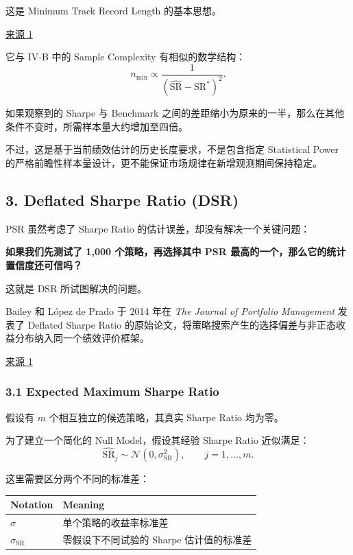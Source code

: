 这是 Minimum Track Record Length 的基本思想。

\href{https://papers.ssrn.com/sol3/papers.cfm?abstract_id=1821643.}{来源 1}

它与 IV-B 中的 Sample Complexity 有相似的数学结构：
\[n_{\min}
\propto
\frac1{(\widehat{\mathrm{SR}}-\mathrm{SR}^*)^2}.\]

如果观察到的 Sharpe 与 Benchmark 之间的差距缩小为原来的一半，那么在其他条件不变时，所需样本量大约增加至四倍。

不过，这是基于当前绩效估计的历史长度要求，不是包含指定 Statistical Power 的严格前瞻性样本量设计，更不能保证市场规律在新增观测期间保持稳定。

\hypertarget{part-4-71-0001-deflated-sharpe-ratio-dsr}{%
\subsection{3. Deflated Sharpe Ratio (DSR)}\label{part-4-71-0001-deflated-sharpe-ratio-dsr}}

PSR 虽然考虑了 Sharpe Ratio 的估计误差，却没有解决一个关键问题：

\textbf{如果我们先测试了 1,000 个策略，再选择其中 PSR 最高的一个，那么它的统计置信度还可信吗？}

这就是 DSR 所试图解决的问题。

Bailey 和 López de Prado 于 2014 年在 \emph{The Journal of Portfolio Management} 发表了 Deflated Sharpe Ratio 的原始论文，将策略搜索产生的选择偏差与非正态收益分布纳入同一个绩效评价框架。

\href{https://doi.org/10.3905/jpm.2014.40.5.094?trk=article-ssr-frontend-pulse_little-text-block}{来源 1}

\hypertarget{part-4-71-0001-expected-maximum-sharpe-ratio}{%
\subsubsection{3.1 Expected Maximum Sharpe Ratio}\label{part-4-71-0001-expected-maximum-sharpe-ratio}}

假设有 \(m\) 个相互独立的候选策略，其真实 Sharpe Ratio 均为零。

为了建立一个简化的 Null Model，假设其经验 Sharpe Ratio 近似满足：
\[\widehat{\mathrm{SR}}_j
\sim\mathcal N(0,\sigma_{\mathrm{SR}}^2),
\qquad j=1,\ldots,m.\]

这里需要区分两个不同的标准差：

\begin{readertable}
\begin{longtable}[]{@{}
  >{\raggedright\arraybackslash}p{}
  >{\raggedright\arraybackslash}p{}@{}}
\toprule
Notation & Meaning \\
\midrule
\endhead
\(\sigma\) & 单个策略的收益率标准差 \\
\(\sigma_{\mathrm{SR}}\) & 零假设下不同试验的 Sharpe 估计值的标准差 \\
\bottomrule
\end{longtable}
\end{readertable}

